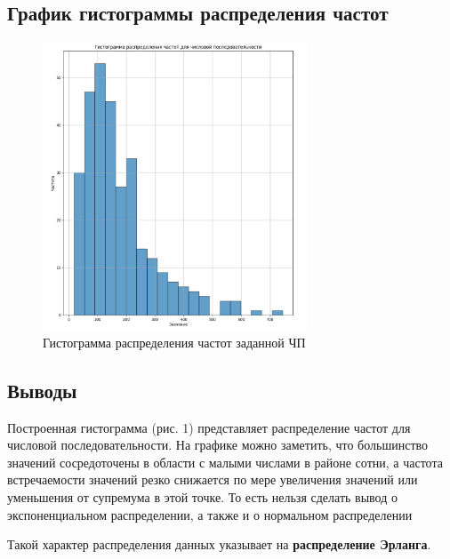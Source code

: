 \subsection{График гистограммы распределения частот}

\FloatBarrier
\begin{figure}[h]
	\centering
	\includegraphics[width=0.7\textwidth]{../data/histogram.png}
	\caption{Гистограмма распределения частот заданной ЧП}
\end{figure}
\FloatBarrier

\subsection{Выводы}

Построенная гистограмма (рис. 1) представляет распределение частот для числовой последовательности. На графике можно заметить, что большинство значений сосредоточены в области с малыми числами в районе сотни, а частота встречаемости значений резко снижается по мере увеличения значений или уменьшения от супремума в этой точке. То есть нельзя сделать вывод о экспоненциальном распределении, а также и о нормальном распределении

Такой характер распределения данных указывает на \textbf{распределение Эрланга}. 
